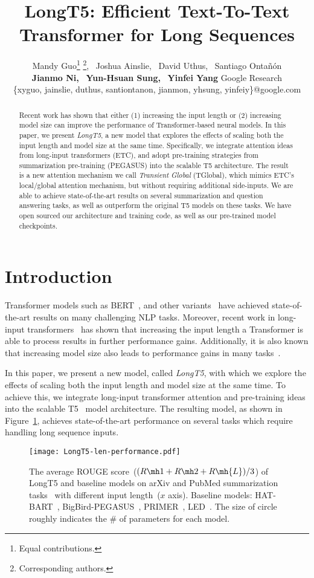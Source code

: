 \documentclass[11pt]{article}
\title{LongT5: Efficient Text-To-Text Transformer for Long Sequences}
\author{Mandy Guo\thanks{\hspace{2mm}Equal contributions.} \thanks{\hspace{2mm} Corresponding authors.},~
Joshua Ainslie\footnotemark[1]    \footnotemark[2],~
David Uthus\footnotemark[1],~ Santiago Onta\~{n}\'{o}n\footnotemark[1]\\
{\bf Jianmo Ni,}~
{\bf Yun{-}Hsuan Sung,}~
{\bf Yinfei Yang}
  \AND
  {\rm Google Research}\\
 \{xyguo, jainslie, duthus, santiontanon, jianmon, yhsung, yinfeiy\}@google.com
}
\begin{document}
\maketitle
\begin{abstract}
Recent work has shown that either (1) increasing the input length or (2) increasing model size can improve the performance of Transformer-based neural models. In this paper, we present {\em LongT5}, a new model that explores the effects of scaling both the input length and model size at the same time. 
Specifically, we integrate attention ideas from long-input transformers (ETC), and adopt pre-training strategies from summarization pre-training (PEGASUS) into the scalable T5 architecture. The result is a new attention mechanism we call {\em Transient Global} (TGlobal), which mimics ETC's local/global attention mechanism, but without requiring additional side-inputs. We are able to achieve state-of-the-art results on several summarization and question answering tasks, as well as outperform the original T5 models on these tasks. We have open sourced our architecture and training code, as well as our pre-trained model checkpoints.
\end{abstract}

\section{Introduction}

Transformer models such as BERT~\cite{devlin-etal-2019-bert}, and other variants~\cite{liu2019roberta,Radford2019LanguageMA,t5,lewis-etal-2020-bart} have achieved state-of-the-art results on many challenging NLP tasks. 
Moreover, recent work in long-input transformers~\cite{etc,zaheer2020,Beltagy2020Longformer,tay2021long} has shown that increasing the input length a Transformer is able to process results in further performance gains. Additionally, it is also known that increasing model size also leads to performance gains in many tasks~\cite{kaplan2020scaling}. 

In this paper, we present a new model, called {\em LongT5}, with which we explore the effects of scaling both the input length and model size at the same time.
To achieve this, we integrate long-input transformer attention and pre-training ideas into the scalable T5~\cite{t5} model architecture.
The resulting model, as shown in Figure~\ref{fig:gtr_avg}, achieves state-of-the-art performance on several tasks which require handling long sequence inputs.

\begin{figure}[t]
  \centering
  \texttt{[image: LongT5-len-performance.pdf]}
  \caption{The average ROUGE score~($(R\mh1+R\mh2+R\mh{L})/3$) of LongT5 and baseline models on arXiv and PubMed summarization tasks~\cite{cohan-etal-2018-discourse} with different input length~($x$ axis). Baseline models: HAT-BART~\cite{rohde2021hierarchical}, BigBird-PEGASUS~\cite{zaheer2020}, PRIMER~\cite{xiao2021primer}, LED~\cite{Beltagy2020Longformer}. The size of circle roughly indicates the $\#$ of parameters for each model.
  }
  \label{fig:gtr_avg}
\end{figure}
\end{document}

